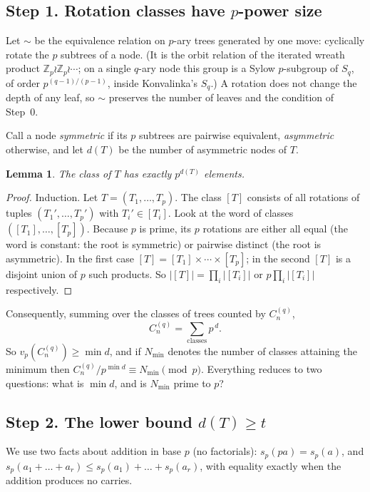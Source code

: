 \documentclass[11pt]{article}
\newtheorem{lemma}{Lemma}
\theoremstyle{definition}
\newcommand{\vp}{v_p}
\newcommand{\sd}{s_p}
\newcommand{\C}[1]{C^{(q)}_{#1}}
\newcommand{\Z}{\mathbb{Z}}
\begin{document}
\subsection*{Step 1. Rotation classes have $p$-power size}

Let $\sim$ be the equivalence relation on $p$-ary trees generated by one move: cyclically
rotate the $p$ subtrees of a node. (It is the orbit relation of the iterated wreath product
$\Z_p\wr\Z_p\wr\cdots$; on a single $q$-ary node this group is a Sylow $p$-subgroup of $S_q$,
of order $p^{(q-1)/(p-1)}$, inside Konvalinka's $S_q$.) A rotation does not change the depth
of any leaf, so $\sim$ preserves the number of leaves and the condition of Step~0.

Call a node \emph{symmetric} if its $p$ subtrees are pairwise equivalent, \emph{asymmetric}
otherwise, and let $d(T)$ be the number of asymmetric nodes of $T$.

\begin{lemma}\label{lem:size}
The class of $T$ has exactly $p^{d(T)}$ elements.
\end{lemma}
\begin{proof}
Induction. Let $T=(T_1,\dots,T_p)$. The class $[T]$ consists of all rotations of tuples
$(T_1',\dots,T_p')$ with $T_i'\in[T_i]$. Look at the word of classes $([T_1],\dots,[T_p])$.
Because $p$ is prime, its $p$ rotations are either all equal (the word is constant: the root
is symmetric) or pairwise distinct (the root is asymmetric). In the first case
$[T]=[T_1]\times\cdots\times[T_p]$; in the second $[T]$ is a disjoint union of $p$ such
products. So $|[T]|=\prod_i|[T_i]|$ or $p\prod_i|[T_i]|$ respectively.
\end{proof}

Consequently, summing over the classes of trees counted by $\C{n}$,
\begin{equation}\label{eq:sum}
  \C{n}=\sum_{\text{classes}} p^{\,d}.
\end{equation}
So $\vp(\C{n})\ge \min d$, and if $N_{\min}$ denotes the number of classes attaining the
minimum then $\C{n}/p^{\min d}\equiv N_{\min}\pmod p$. Everything reduces to two questions:
what is $\min d$, and is $N_{\min}$ prime to $p$?

\subsection*{Step 2. The lower bound $d(T)\ge t$}

We use two facts about addition in base $p$ (no factorials): $\sd(pa)=\sd(a)$, and
$\sd(a_1+\dots+a_r)\le \sd(a_1)+\dots+\sd(a_r)$, with equality exactly when the addition
produces no carries.
\end{document}
